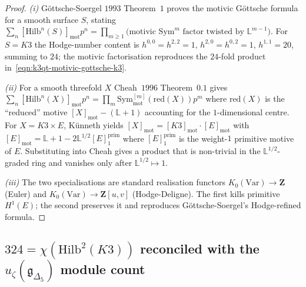 \begin{proof}
\emph{(i)} Göttsche-Soergel $1993$ Theorem~$1$ proves the motivic
Göttsche formula for a smooth surface $S$, stating
$\sum_n [\mathrm{Hilb}^n(S)]_{\mathrm{mot}} p^n =
\prod_{m \geq 1} \bigl(\text{motivic } \mathrm{Sym}^m \text{ factor
twisted by } \mathbb L^{m-1}\bigr)$.
For $S = K3$ the Hodge-number content is
$h^{0,0} = h^{2,2} = 1$, $h^{2,0} = h^{0,2} = 1$, $h^{1,1} = 20$,
summing to $24$; the motivic factorisation reproduces the $24$-fold
product in~\eqref{eqn:k3qt-motivic-gottsche-k3}.

\emph{(ii)} For a smooth threefold $X$ Cheah~$1996$ Theorem~$0.1$
gives
$\sum_n [\mathrm{Hilb}^n(X)]_{\mathrm{mot}} p^n =
 \prod_m \mathrm{Sym}^{[m]}_{\mathrm{mot}}(\mathrm{red}(X)) p^m$
where $\mathrm{red}(X)$ is the ``reduced'' motive
$[X]_{\mathrm{mot}} - (\mathbb L + 1)$ accounting for the
$1$-dimensional centre. For $X = K3 \times E$, Künneth yields
$[X]_{\mathrm{mot}} = [K3]_{\mathrm{mot}} \cdot [E]_{\mathrm{mot}}$
with $[E]_{\mathrm{mot}} = \mathbb L + 1 - 2 \mathbb L^{1/2}
[E]^{\mathrm{prim}}_1$ where $[E]^{\mathrm{prim}}_1$ is the weight-$1$
primitive motive of $E$. Substituting into Cheah gives a product
that is non-trivial in the $\mathbb L^{1/2}$-graded ring and
vanishes only after $\mathbb L^{1/2} \mapsto 1$.

\emph{(iii)} The two specialisations are standard realisation
functors $K_0(\mathrm{Var}) \to \mathbf Z$ (Euler) and
$K_0(\mathrm{Var}) \to \mathbf Z[u, v]$ (Hodge-Deligne). The
first kills primitive $H^1(E)$; the second preserves it and
reproduces Göttsche-Soergel's Hodge-refined formula.
\end{proof}

\subsection*{\texorpdfstring{$324 = \chi(\mathrm{Hilb}^2(K3))$}{324 = chi(Hilb-2(K3))} reconciled
with the \texorpdfstring{$u_\zeta(\mathfrak g_{\Delta_5})$}{u-zeta(g-Delta-5)} module count}

